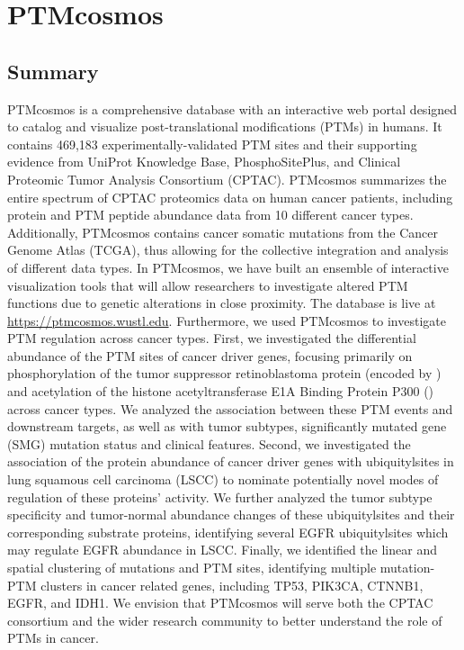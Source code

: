 \chapter{PTMcosmos}
\label{chap:ptmcosmos}



\section{Summary}
PTMcosmos is a comprehensive database with an interactive web portal designed to catalog and visualize post-translational modifications (PTMs) in humans. It contains 469,183 experimentally-validated PTM sites and their supporting evidence from UniProt Knowledge Base, PhosphoSitePlus, and Clinical Proteomic Tumor Analysis Consortium (CPTAC). PTMcosmos summarizes the entire spectrum of CPTAC proteomics data on human cancer patients, including protein and PTM peptide abundance data from 10 different cancer types. Additionally, PTMcosmos contains cancer somatic mutations from the Cancer Genome Atlas (TCGA), thus allowing for the collective integration and analysis of different data types.  In PTMcosmos, we have built an ensemble of interactive visualization tools that will allow researchers to investigate altered PTM functions due to genetic alterations in close proximity. The database is live at \url{https://ptmcosmos.wustl.edu}. Furthermore, we used PTMcosmos to investigate PTM regulation across cancer types. First, we investigated the differential abundance of the PTM sites of cancer driver genes, focusing primarily on phosphorylation of the tumor suppressor retinoblastoma protein (encoded by )  and acetylation of the histone acetyltransferase E1A Binding Protein P300 () across cancer types. We analyzed the association between these PTM events and downstream targets, as well as with tumor subtypes, significantly mutated gene (SMG) mutation status  and clinical features. Second, we investigated the association of the protein abundance of cancer driver genes with ubiquitylsites in lung squamous cell carcinoma (LSCC) to nominate potentially novel modes of regulation of these proteins’ activity. We further analyzed the tumor subtype specificity and tumor-normal abundance changes of these ubiquitylsites and their corresponding substrate proteins, identifying several EGFR ubiquitylsites which may regulate EGFR abundance in LSCC. Finally, we identified the linear and spatial clustering of mutations and PTM sites, identifying multiple mutation-PTM clusters in cancer related genes, including TP53, PIK3CA, CTNNB1, EGFR, and IDH1. We envision that PTMcosmos will serve both the CPTAC consortium and the wider research community to better understand the role of PTMs in cancer.


